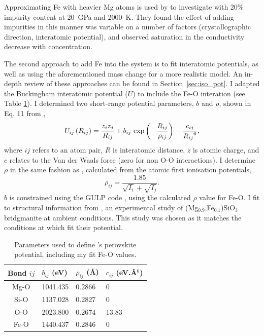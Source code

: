Approximating Fe with heavier Mg atoms is used by \citet{Ammann2014} to investigate \mgfesios with 20\% impurity content at 20~GPa and 2000~K. They found the effect of adding impurities in this manner was variable on a number of factors (crystallographic direction, interatomic potential), and observed saturation in the conductivity decrease with concentration. 

The second approach to add Fe into the \mgsios system is to fit interatomic potentials, as well as using the aforementioned mass change for a more realistic model. An in-depth review of these approaches can be found in Section~\ref{sec:iso_pot}.  I adapted the \citet{Oganov2000} \mgsios Buckingham interatomic potential ($U$) to include the Fe-O interation (see Table \ref{tab:oganov_param_mod}). I determined two short-range potential parameters, $b$ and $\rho$, shown in Eq. 11 from \citet{Oganov2000},
%
\begin{equation}
U_{ij}\left ( R_{ij} \right ) = \frac{z_{i}z_{j}}{R_{ij}} + b_{ij}\ \textup{exp}\left ( - \frac{R_{ij}}{\rho_{ij}} \right ) - \frac{c_{ij}}{{R_{ij}}^{6}}, \label{og_buck}
\end{equation}
%
where $ij$ refers to an atom pair, $R$ is interatomic distance, $z$ is atomic charge, and $c$ relates to the Van der Waals force (zero for non O-O interactions). I determine $\rho$ in the same fashion as \citet{Oganov2000}, calculated from the atomic first ionisation potentials,
%
\begin{equation}
\rho_{ij} = \frac{1.85}{\sqrt{I_{i}}+\sqrt{I_{j}}}.  \label{urusov}
\end{equation}
%
$b$ is constrained using the GULP code \citep{Gale1997}, using the calculated $\rho$ value for Fe-O. I fit to structural information from \citet{Parise1990}, an experimental study of (Mg$_{0.9}$,Fe$_{0.1}$)SiO$_3$ bridgmanite at ambient conditions. This study was chosen as it matches the conditions at which \citet{Oganov2000} fit their potential. 

\begin{table}[h]
\centering
\caption[CONTENTS BIT]{\label{tab:oganov_param_mod}Parameters used to define \citet{Oganov2000}'s \mgsios perovskite potential, including my fit Fe-O values.}
\begin{tabular}{clll} 
Bond $ij$ & $b_{ij}$ (eV)  & $\rho_{ij}$ (\AA) & $c_{ij}$ (eV.\AA$^{6}$) \\ \hline
Mg-O        & 1041.435        & 0.2866                 & 0                \\
Si-O          & 1137.028        & 0.2827                 & 0                \\
O-O          & 2023.800        & 0.2674                  & 13.83 \\ 
Fe-O         & 1440.437        & 0.2846                  & 0 \\ \hline       
\end{tabular}
\end{table}

